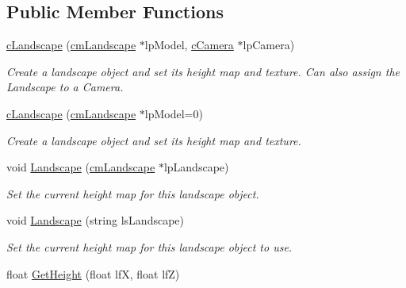 \subsection*{Public Member Functions}
\begin{DoxyCompactItemize}
\item 
\hypertarget{classc_landscape_afc86bc9f2d3ce929abc8ef5e6dcd1248}{
\hyperlink{classc_landscape_afc86bc9f2d3ce929abc8ef5e6dcd1248}{cLandscape} (\hyperlink{classcm_landscape}{cmLandscape} $\ast$lpModel, \hyperlink{classc_camera}{cCamera} $\ast$lpCamera)}
\label{classc_landscape_afc86bc9f2d3ce929abc8ef5e6dcd1248}

\begin{DoxyCompactList}\small\item\em Create a landscape object and set its height map and texture. Can also assign the Landscape to a Camera. \end{DoxyCompactList}\item 
\hypertarget{classc_landscape_a1fa3ad374cf96116beb5791cc9aa713e}{
\hyperlink{classc_landscape_a1fa3ad374cf96116beb5791cc9aa713e}{cLandscape} (\hyperlink{classcm_landscape}{cmLandscape} $\ast$lpModel=0)}
\label{classc_landscape_a1fa3ad374cf96116beb5791cc9aa713e}

\begin{DoxyCompactList}\small\item\em Create a landscape object and set its height map and texture. \end{DoxyCompactList}\item 
\hypertarget{classc_landscape_ac945c88a536fee7dd2f499e199225939}{
void \hyperlink{classc_landscape_ac945c88a536fee7dd2f499e199225939}{Landscape} (\hyperlink{classcm_landscape}{cmLandscape} $\ast$lpLandscape)}
\label{classc_landscape_ac945c88a536fee7dd2f499e199225939}

\begin{DoxyCompactList}\small\item\em Set the current height map for this landscape object. \end{DoxyCompactList}\item 
\hypertarget{classc_landscape_ae30d44a1e780ef4f120c4aa4dc460c06}{
void \hyperlink{classc_landscape_ae30d44a1e780ef4f120c4aa4dc460c06}{Landscape} (string lsLandscape)}
\label{classc_landscape_ae30d44a1e780ef4f120c4aa4dc460c06}

\begin{DoxyCompactList}\small\item\em Set the current height map for this landscape object to use. \end{DoxyCompactList}\item 
\hypertarget{classc_landscape_a36f6a35064d14d460f99464181c5c830}{
float \hyperlink{classc_landscape_a36f6a35064d14d460f99464181c5c830}{GetHeight} (float lfX, float lfZ)}
\label{classc_landscape_a36f6a35064d14d460f99464181c5c830}


\end{DoxyCompactItemize}
